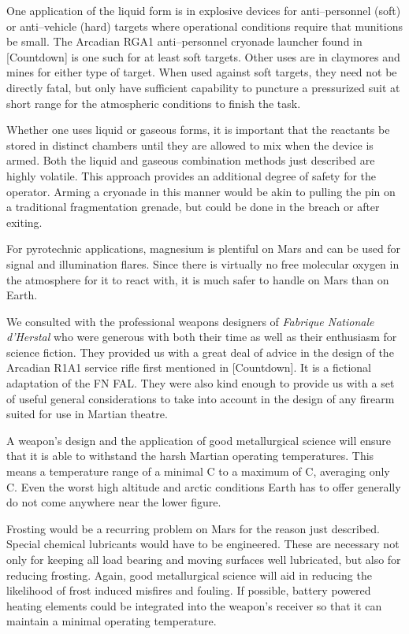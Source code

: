 One application of the liquid form is in explosive devices for anti--personnel (soft) or anti--vehicle (hard) targets where operational conditions require that munitions be small. The Arcadian RGA1 anti--personnel cryonade launcher found in [Countdown] is one such for at least soft targets. Other uses are in claymores and mines for either type of target. When used against soft targets, they need not be directly fatal, but only have sufficient capability to puncture a pressurized suit at short range for the atmospheric conditions to finish the task.

Whether one uses liquid or gaseous forms, it is important that the reactants be stored in distinct chambers until they are allowed to mix when the device is armed. Both the liquid and gaseous combination methods just described are highly volatile. This approach provides an additional degree of safety for the operator. Arming a cryonade in this manner would be akin to pulling the pin on a traditional fragmentation grenade, but could be done in the breach or after exiting.

For pyrotechnic applications, magnesium is plentiful on Mars and can be used for signal and illumination flares. Since there is virtually no free molecular oxygen in the atmosphere for it to react with, it is much safer to handle on Mars than on Earth.


We consulted with the professional weapons designers of {\it Fabrique Nationale d'Herstal} who were generous with both their time as well as their enthusiasm for science fiction. They provided us with a great deal of advice in the design of the Arcadian R1A1 service rifle first mentioned in [Countdown]. It is a fictional adaptation of the FN FAL. They were also kind enough to provide us with a set of useful general considerations to take into account in the design of any firearm suited for use in Martian theatre.

A weapon's design and the application of good metallurgical science will ensure that it is able to withstand the harsh Martian operating temperatures. This means a temperature range of a minimal C to a maximum of C, averaging only C. Even the worst high altitude and arctic conditions Earth has to offer generally do not come anywhere near the lower figure. 

Frosting would be a recurring problem on Mars for the reason just described. Special chemical lubricants would have to be engineered. These are necessary not only for keeping all load bearing and moving surfaces well lubricated, but also for reducing frosting. Again, good metallurgical science will aid in reducing the likelihood of frost induced misfires and fouling. If possible, battery powered heating elements could be integrated into the weapon's receiver so that it can maintain a minimal operating temperature.

